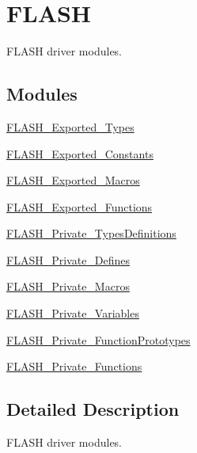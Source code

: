 \hypertarget{group___f_l_a_s_h}{}\section{F\+L\+A\+SH}
\label{group___f_l_a_s_h}


F\+L\+A\+SH driver modules.  


\subsection*{Modules}
\begin{DoxyCompactItemize}
\item 
\hyperlink{group___f_l_a_s_h___exported___types}{F\+L\+A\+S\+H\+\_\+\+Exported\+\_\+\+Types}
\item 
\hyperlink{group___f_l_a_s_h___exported___constants}{F\+L\+A\+S\+H\+\_\+\+Exported\+\_\+\+Constants}
\item 
\hyperlink{group___f_l_a_s_h___exported___macros}{F\+L\+A\+S\+H\+\_\+\+Exported\+\_\+\+Macros}
\item 
\hyperlink{group___f_l_a_s_h___exported___functions}{F\+L\+A\+S\+H\+\_\+\+Exported\+\_\+\+Functions}
\item 
\hyperlink{group___f_l_a_s_h___private___types_definitions}{F\+L\+A\+S\+H\+\_\+\+Private\+\_\+\+Types\+Definitions}
\item 
\hyperlink{group___f_l_a_s_h___private___defines}{F\+L\+A\+S\+H\+\_\+\+Private\+\_\+\+Defines}
\item 
\hyperlink{group___f_l_a_s_h___private___macros}{F\+L\+A\+S\+H\+\_\+\+Private\+\_\+\+Macros}
\item 
\hyperlink{group___f_l_a_s_h___private___variables}{F\+L\+A\+S\+H\+\_\+\+Private\+\_\+\+Variables}
\item 
\hyperlink{group___f_l_a_s_h___private___function_prototypes}{F\+L\+A\+S\+H\+\_\+\+Private\+\_\+\+Function\+Prototypes}
\item 
\hyperlink{group___f_l_a_s_h___private___functions}{F\+L\+A\+S\+H\+\_\+\+Private\+\_\+\+Functions}
\end{DoxyCompactItemize}


\subsection{Detailed Description}
F\+L\+A\+SH driver modules. 

